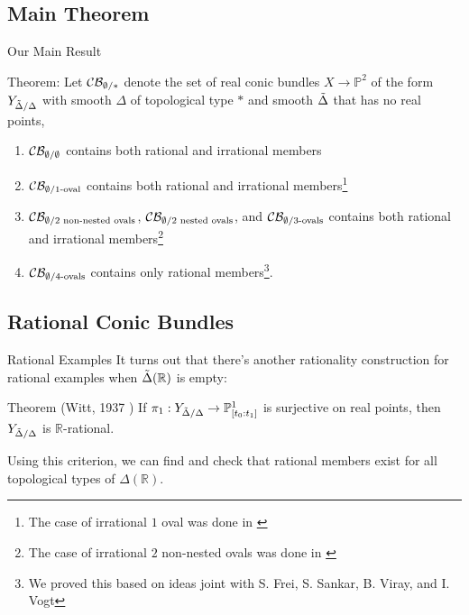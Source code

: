 \documentclass[hyperref, notheorems]{beamer}
\newcommand{\Rbb}{\mathbb{R}}
\newcommand{\Pbb}{\mathbb{P}}
\newcommand{\Ydd}{Y_{\Tilde{\Delta} /\Delta}}
\theoremstyle{definition}
\begin{document}
\subsection{Main Theorem}
\begin{frame}{Our Main Result}
\begin{block}{Theorem:}
    Let \(\cal C\cal B_{\emptyset/*}\) denote the set of real conic bundles \(X\to \Pbb^2\) of the form $\Ydd$ with smooth \(\Delta\) of topological type \(*\) and smooth \(\Tilde{\Delta}\) that has no real points,
    \begin{enumerate}
        \item \(\cal C\cal B_{\emptyset/\emptyset}\) contains both rational and irrational members 
        \item \(\cal C\cal B_{\emptyset/\text{1-oval}}\) contains both rational and irrational members\footnote{The case of irrational $1$ oval was done in \cite{FJSVV}}
        \item \(\cal C\cal B_{\emptyset/\text{2 non-nested ovals}}\), \(\cal C\cal B_{\emptyset/\text{2 nested ovals}}\), and \(\cal C\cal B_{\emptyset/\text{3-ovals}}\) contains both rational and irrational members\footnote{The case of irrational $2$ non-nested ovals was done in \cite{FJSVV}}
        \item \(\cal C\cal B_{\emptyset/\text{4-ovals}}\) contains only rational members\footnote{We proved this based on ideas joint with S. Frei, S. Sankar, B. Viray, and I. Vogt}.
    \end{enumerate}
\end{block}
\end{frame}

\subsection{Rational Conic Bundles}

\begin{frame}{Rational Examples}
    It turns out that there's another rationality construction for rational examples when $\Tilde{\Delta}(\Rbb)$ is empty:
    \begin{block}{Theorem (Witt, 1937 \cite{Witt-quadratic-forms})}
        If $\pi_1: \Ydd \to \Pbb^1_{[t_0: t_1]}$ is surjective on real points, then $\Ydd$ is $\Rbb$-rational.
    \end{block}
    Using this criterion, we can find and check that rational members exist for all topological types of $\Delta(\Rbb)$.

\end{frame}
\end{document}
